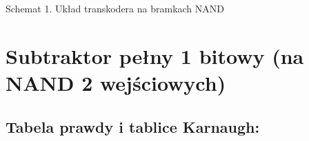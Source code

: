 \documentclass[12pt,a4paper]{article}
\begin{document}
		\vspace{0.5cm}
		\begin{center}
			Schemat 1. Układ transkodera na bramkach NAND
		\end{center}
		
	\section{Subtraktor pełny 1 bitowy (na NAND 2 wejściowych)}
		
		\subsection{Tabela prawdy i tablice Karnaugh:}
			
\end{document}
